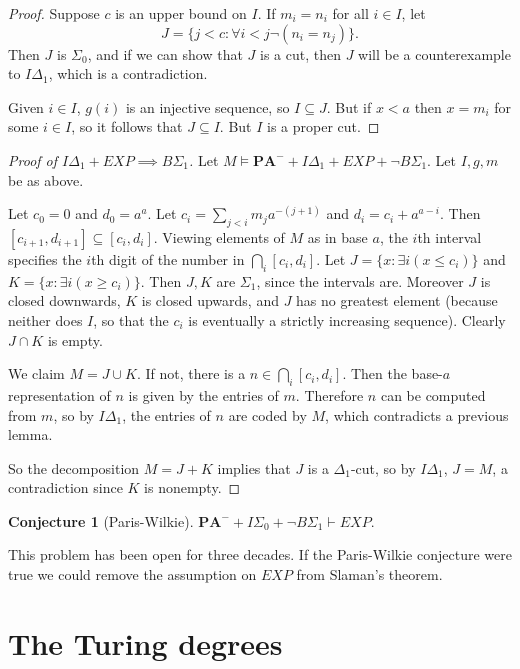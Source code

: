\documentclass[12pt]{report}
\newcommand{\PA}{\mathbf{PA}}
\newcommand{\proves}{\vdash}
\theoremstyle{definition}
\newtheorem{conjecture}[theorem]{Conjecture}
\begin{document}
\begin{proof}
Suppose $c$ is an upper bound on $I$. If $m_i = n_i$ for all $i \in I$, let
$$J = \{j < c: \forall i < j \neg(n_i = n_j)\}.$$
Then $J$ is $\Sigma_0$, and if we can show that $J$ is a cut, then $J$ will be a counterexample to $I\Delta_1$, which is a contradiction.

Given $i \in I$, $g(i)$ is an injective sequence, so $I \subseteq J$. But if $x < a$ then $x = m_i$ for some $i \in I$, so it follows that $J \subseteq I$. But $I$ is a proper cut.
\end{proof}
\begin{proof}[Proof of $I\Delta_1+EXP \implies B\Sigma_1$]
Let $M \models \PA^-+I\Delta_1+EXP+\neg B\Sigma_1$. Let $I, g, m$ be as above.

Let $c_0 = 0$ and $d_0 = a^a$. Let $c_i = \sum_{j<i} m_ja^{-(j+1)}$ and $d_i=c_i+a^{a-i}$. Then $[c_{i+1}, d_{i+1}] \subseteq [c_i, d_i]$.
Viewing elements of $M$ as in base $a$, the $i$th interval specifies the $i$th digit of the number in $\bigcap_i [c_i, d_i]$.
Let $J = \{x: \exists i( x\leq c_i)\}$ and $K = \{x: \exists i(x \geq c_i)\}$. Then $J,K$ are $\Sigma_1$, since the intervals are.
Moreover $J$ is closed downwards, $K$ is closed upwards, and $J$ has no greatest element (because neither does $I$, so that the $c_i$ is eventually a strictly increasing sequence). Clearly $J \cap K$ is empty.

We claim $M = J \cup K$. If not, there is a $n \in \bigcap_i [c_i, d_i]$. Then the base-$a$ representation of $n$ is given by the entries of $m$. Therefore $n$ can be computed from $m$, so by $I\Delta_1$, the entries of $n$ are coded by $M$, which contradicts a previous lemma.

So the decomposition $M = J + K$ implies that $J$ is a $\Delta_1$-cut, so by $I\Delta_1$, $J = M$, a contradiction since $K$ is nonempty.
\end{proof}
\begin{conjecture}[Paris-Wilkie]
$\PA^-+I\Sigma_0+\neg B\Sigma_1 \proves EXP$.
\end{conjecture}
This problem has been open for three decades. If the Paris-Wilkie conjecture were true we could remove the assumption on $EXP$ from Slaman's theorem.

\chapter{The Turing degrees}
\end{document}
